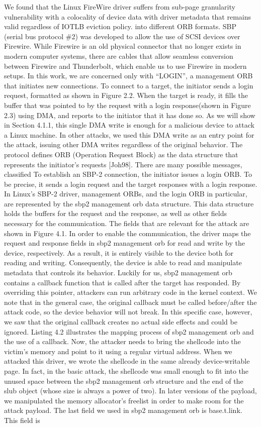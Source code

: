 We found that the Linux FireWire driver suffers from sub-page granularity vulnerability with a colocality of device data with driver metadata that remains valid regardless of IOTLB eviction policy. into different ORB formats. SBP (serial bus protocol \#2) was developed to allow the use of SCSI devices over Firewire. While Firewire is an old physical connector that no longer exists in modern computer systems, there are cables that allow seamless conversion between Firewire and Thunderbolt, which enable us to use Firewire in modern setups. In this work, we are concerned only with “LOGIN”, a management ORB that initiates new connections. To connect to a target, the initiator sends a login request, formatted as shown in Figure 2.2. When the target is ready, it fills the buffer that was pointed to by the request with a login response(shown in Figure 2.3) using DMA, and reports to the initiator that it has done so. As we will show in Section 4.1.1, this single DMA write is enough for a malicious device to attack a Linux machine. In other attacks, we used this DMA write as an entry point for the attack, issuing other DMA writes regardless of the original behavior. The protocol defines ORB (Operation Request Block) as the data structure that represents the initiator’s requests [Joh98]. There are many possible messages, classified To establish an SBP-2 connection, the initiator issues a login ORB. To be precise, it sends a login request and the target responses with a login response. In Linux’s SBP-2 driver, management ORBs, and the login ORB in particular, are represented by the sbp2 management orb data structure. This data structure holds the buffers for the request and the response, as well as other fields necessary for the communication. The fields that are relevant for the attack are shown in Figure 4.1. In order to enable the communication, the driver maps the request and response fields in sbp2 management orb for read and write by the device, respectively. As a result, it is entirely visible to the device both for reading and writing. Consequently, the device is able to read and manipulate metadata that controls its behavior. Luckily for us, sbp2 management orb contains a callback function that is called after the target has responded. By overriding this pointer, attackers can run arbitrary code in the kernel context. We note that in the general case, the original callback must be called before/after the attack code, so the device behavior will not break. In this specific case, however, we saw that the original callback creates no actual side effects and could be ignored. Listing 4.2 illustrates the mapping process of sbp2 management orb and the use of a callback. Now, the attacker needs to bring the shellcode into the victim’s memory and point to it using a regular virtual address. When we attacked this driver, we wrote the shellcode in the same already device-writable page. In fact, in the basic attack, the shellcode was small enough to fit into the unused space between the sbp2 management orb structure and the end of the slub object (whose size is always a power of two). In later versions of the payload, we manipulated the memory allocator’s freelist in order to make room for the attack payload. The last field we used in sbp2 management orb is base.t.link. This field is 